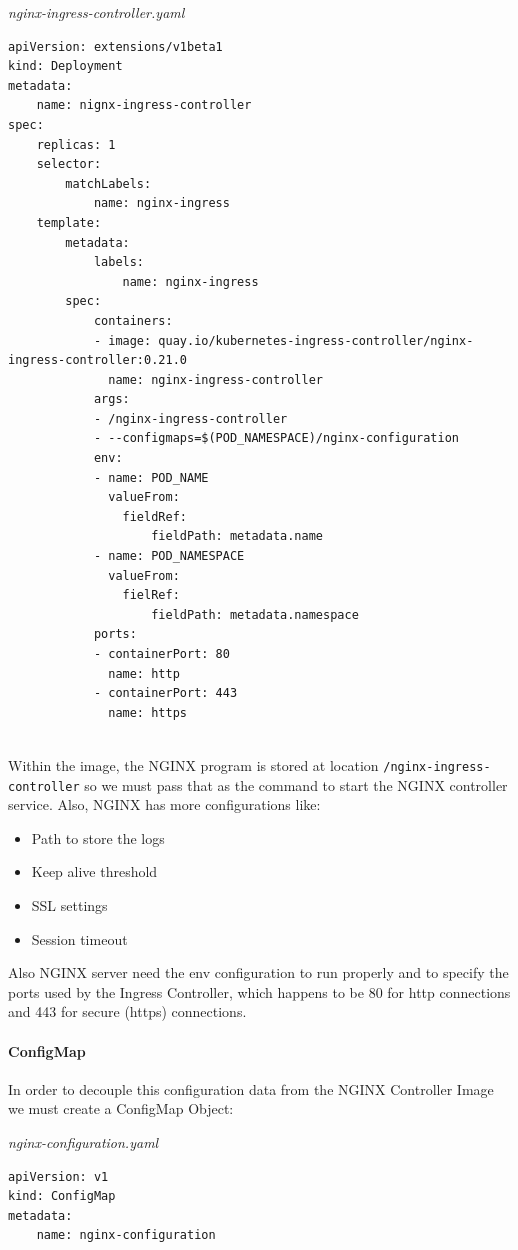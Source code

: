 \documentclass{article}
\newenvironment{codetemplate}[1][]{%
  \mybasecolorbox[#1]
  \itshape
}{%
  \endmybasecolorbox
}
\begin{document}
\begin{codetemplate}{nginx-ingress-controller.yaml}
\begin{verbatim}
apiVersion: extensions/v1beta1
kind: Deployment
metadata:
    name: nignx-ingress-controller
spec:
    replicas: 1
    selector:
        matchLabels:
            name: nginx-ingress
    template:
        metadata:
            labels:
                name: nginx-ingress
        spec:
            containers:
            - image: quay.io/kubernetes-ingress-controller/nginx-ingress-controller:0.21.0
              name: nginx-ingress-controller
            args:
            - /nginx-ingress-controller
            - --configmaps=$(POD_NAMESPACE)/nginx-configuration
            env:
            - name: POD_NAME
              valueFrom:
                fieldRef:
                    fieldPath: metadata.name
            - name: POD_NAMESPACE
              valueFrom:
                fielRef:
                    fieldPath: metadata.namespace
            ports:
            - containerPort: 80
              name: http
            - containerPort: 443
              name: https
            
\end{verbatim}
\end{codetemplate}

Within the image, the NGINX program is stored at location \verb|/nginx-ingress-controller| so we must pass that as the command to start the NGINX controller service. Also, NGINX has more configurations like:
\begin{itemize}
    \item Path to store the logs
    \item Keep alive threshold
    \item SSL settings
    \item Session timeout
\end{itemize}

Also NGINX server need the env configuration to run properly and to specify the ports used by the Ingress Controller, which happens to be 80 for http connections and 443 for secure (https) connections.

\paragraph{ConfigMap}

In order to decouple this configuration data from the NGINX Controller Image we must create a ConfigMap Object:

\begin{codetemplate}{nginx-configuration.yaml}
\begin{verbatim}
apiVersion: v1
kind: ConfigMap
metadata:
    name: nginx-configuration
\end{verbatim}
\end{codetemplate}
\end{document}
